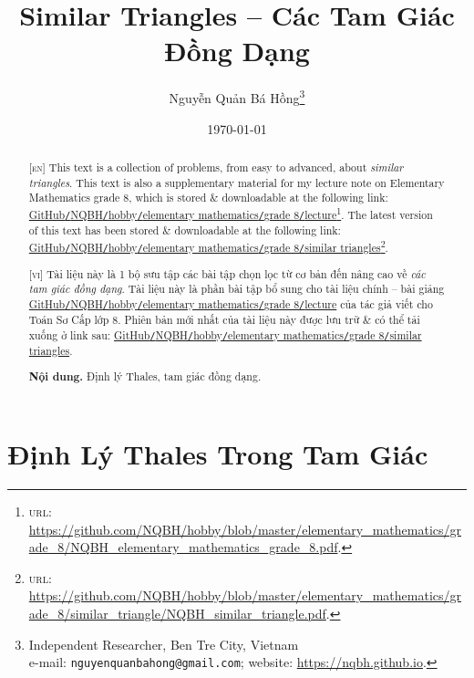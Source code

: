 \documentclass{article}
\title{Similar Triangles -- Các Tam Giác Đồng Dạng}
\author{Nguyễn Quản Bá Hồng\footnote{Independent Researcher, Ben Tre City, Vietnam\\e-mail: \texttt{nguyenquanbahong@gmail.com}; website: \url{https://nqbh.github.io}.}}
\date{\today}
\begin{document}
\maketitle
\begin{abstract}
	\textsc{[en]} This text is a collection of problems, from easy to advanced, about \textit{similar triangles}. This text is also a supplementary material for my lecture note on Elementary Mathematics grade 8, which is stored \& downloadable at the following link: \href{https://github.com/NQBH/hobby/blob/master/elementary_mathematics/grade_8/NQBH_elementary_mathematics_grade_8.pdf}{GitHub\texttt{/}NQBH\texttt{/}hobby\texttt{/}elementary mathematics\texttt{/}grade 8\texttt{/}lecture}\footnote{\textsc{url}: \url{https://github.com/NQBH/hobby/blob/master/elementary_mathematics/grade_8/NQBH_elementary_mathematics_grade_8.pdf}.}. The latest version of this text has been stored \& downloadable at the following link: \href{https://github.com/NQBH/hobby/blob/master/elementary_mathematics/grade_8/similar_triangle/NQBH_similar_triangle.pdf}{GitHub\texttt{/}NQBH\texttt{/}hobby\texttt{/}elementary mathematics\texttt{/}grade 8\texttt{/}similar triangles}\footnote{\textsc{url}: \url{https://github.com/NQBH/hobby/blob/master/elementary_mathematics/grade_8/similar_triangle/NQBH_similar_triangle.pdf}.}.
	\vspace{2mm}
	
	\textsc{[vi]} Tài liệu này là 1 bộ sưu tập các bài tập chọn lọc từ cơ bản đến nâng cao về \textit{các tam giác đồng dạng}. Tài liệu này là phần bài tập bổ sung cho tài liệu chính -- bài giảng \href{https://github.com/NQBH/hobby/blob/master/elementary_mathematics/grade_8/NQBH_elementary_mathematics_grade_8.pdf}{GitHub\texttt{/}NQBH\texttt{/}hobby\texttt{/}elementary mathematics\texttt{/}grade 8\texttt{/}lecture} của tác giả viết cho Toán Sơ Cấp lớp 8. Phiên bản mới nhất của tài liệu này được lưu trữ \& có thể tải xuống ở link sau: \href{https://github.com/NQBH/hobby/blob/master/elementary_mathematics/grade_8/similar_triangle/NQBH_similar_triangle.pdf}{GitHub\texttt{/}NQBH\texttt{/}hobby\texttt{/}elementary mathematics\texttt{/}grade 8\texttt{/}similar triangles}.
	
	\textsf{\textbf{Nội dung.} Định lý Thales, tam giác đồng dạng.}
\end{abstract}
\tableofcontents
\newpage


\section{Định Lý Thales Trong Tam Giác}
\end{document}
